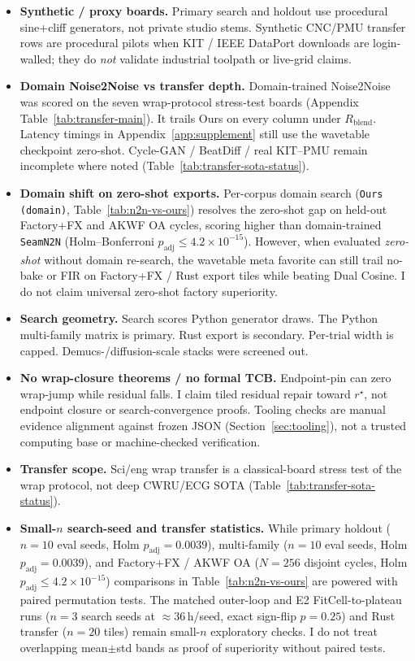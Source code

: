 \begin{itemize}
  \item \textbf{Synthetic / proxy boards.}
    Primary search and holdout use procedural sine{+}cliff generators, not private studio stems.
    Synthetic CNC/PMU transfer rows are procedural pilots when KIT / IEEE DataPort downloads are login-walled;
    they do \emph{not} validate industrial toolpath or live-grid claims.
  \item \textbf{Domain Noise2Noise vs transfer depth.}
    Domain-trained Noise2Noise was scored on the seven wrap-protocol stress-test boards
    (Appendix Table~\ref{tab:transfer-main}). It trails Ours on every column under $R_{\mathrm{blend}}$.
    Latency timings in Appendix~\ref{app:supplement} still use the wavetable checkpoint zero-shot.
    Cycle-GAN / BeatDiff / real KIT--PMU remain incomplete where noted
    (Table~\ref{tab:transfer-sota-status}).
  \item \textbf{Domain shift on zero-shot exports.}
    Per-corpus domain search (\texttt{Ours (domain)}, Table~\ref{tab:n2n-vs-ours}) resolves the zero-shot gap on held-out Factory+FX and AKWF OA cycles, scoring higher than domain-trained \texttt{SeamN2N} (Holm--Bonferroni $p_{\mathrm{adj}}{\le}4.2{\times}10^{-15}$).
    However, when evaluated \emph{zero-shot} without domain re-search, the wavetable meta favorite can still trail no-bake or FIR on Factory+FX / Rust export tiles while beating Dual Cosine.
    I do not claim universal zero-shot factory superiority.
  \item \textbf{Search geometry.}
    Search scores Python generator draws.
    The Python multi-family matrix is primary. Rust export is secondary.
    Per-trial width is capped. Demucs-/diffusion-scale stacks were screened out.
  \item \textbf{No wrap-closure theorems / no formal TCB.}
    Endpoint-pin can zero wrap-jump while residual falls.
    I claim tiled residual repair toward $r^{\star}$, not endpoint closure or search-convergence proofs.
    Tooling checks are manual evidence alignment against frozen JSON (Section~\ref{sec:tooling}), not a trusted computing base or machine-checked verification.
  \item \textbf{Transfer scope.}
    Sci/eng wrap transfer is a classical-board stress test of the wrap protocol, not deep CWRU/ECG SOTA
    (Table~\ref{tab:transfer-sota-status}).
  \item \textbf{Small-$n$ search-seed and transfer statistics.}
    While primary holdout ($n{=}10$ eval seeds, Holm $p_{\mathrm{adj}}{=}0.0039$), multi-family ($n{=}10$ eval seeds, Holm $p_{\mathrm{adj}}{=}0.0039$), and Factory+FX / AKWF OA ($N{=}256$ disjoint cycles, Holm $p_{\mathrm{adj}}{\le}4.2{\times}10^{-15}$) comparisons in Table~\ref{tab:n2n-vs-ours} are powered with paired permutation tests. The matched outer-loop and E2 FitCell-to-plateau runs ($n{=}3$ search seeds at ${\approx}36$\,h/seed, exact sign-flip $p{=}0.25$) and Rust transfer ($n{=}20$ tiles) remain small-$n$ exploratory checks. I do not treat overlapping mean$\pm$std bands as proof of superiority without paired tests.

\end{itemize}
